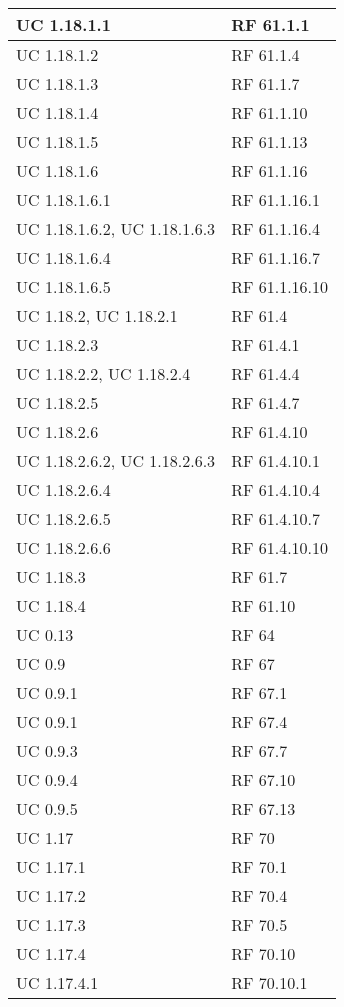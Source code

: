 {\begin{longtable} [c]{| p{4cm} | p{4cm} |}
 \hline 
UC 1.18.1.1 & RF 61.1.1\\ 
 \hline 
UC 1.18.1.2 & RF 61.1.4\\ 
 \hline 
UC 1.18.1.3 & RF 61.1.7\\ 
 \hline 
UC 1.18.1.4 & RF 61.1.10\\ 
 \hline 
UC 1.18.1.5 & RF 61.1.13\\ 
 \hline 
UC 1.18.1.6 & RF 61.1.16\\ 
 \hline 
UC 1.18.1.6.1 & RF 61.1.16.1\\ 
 \hline 
UC 1.18.1.6.2, UC 1.18.1.6.3 & RF 61.1.16.4\\ 
 \hline 
UC 1.18.1.6.4 & RF 61.1.16.7\\ 
 \hline 
UC 1.18.1.6.5 & RF 61.1.16.10\\ 
 \hline 
UC 1.18.2, UC 1.18.2.1 & RF 61.4\\ 
 \hline 
UC 1.18.2.3 & RF 61.4.1\\ 
 \hline 
UC 1.18.2.2, UC 1.18.2.4 & RF 61.4.4\\ 
 \hline 
UC 1.18.2.5 & RF 61.4.7\\ 
 \hline 
UC 1.18.2.6 & RF 61.4.10\\ 
 \hline 
UC 1.18.2.6.2, UC 1.18.2.6.3 & RF 61.4.10.1\\ 
 \hline 
UC 1.18.2.6.4 & RF 61.4.10.4\\ 
 \hline 
UC 1.18.2.6.5 & RF 61.4.10.7\\ 
 \hline 
UC 1.18.2.6.6 & RF 61.4.10.10\\ 
 \hline 
UC 1.18.3 & RF 61.7\\ 
 \hline 
UC 1.18.4 & RF 61.10\\ 
 \hline 
UC 0.13 & RF 64\\ 
 \hline 
UC 0.9 & RF 67\\ 
 \hline 
UC 0.9.1 & RF 67.1\\ 
 \hline 
UC 0.9.1 & RF 67.4\\ 
 \hline 
UC 0.9.3 & RF 67.7\\ 
 \hline 
UC 0.9.4 & RF 67.10\\ 
 \hline 
UC 0.9.5 & RF 67.13\\ 
 \hline 
UC 1.17 & RF 70\\ 
 \hline 
UC 1.17.1 & RF 70.1\\ 
 \hline 
UC 1.17.2 & RF 70.4\\ 
 \hline 
UC 1.17.3 & RF 70.5\\ 
 \hline 
UC 1.17.4 & RF 70.10\\ 
 \hline 
UC 1.17.4.1 & RF 70.10.1\\ 

\end{longtable}}
